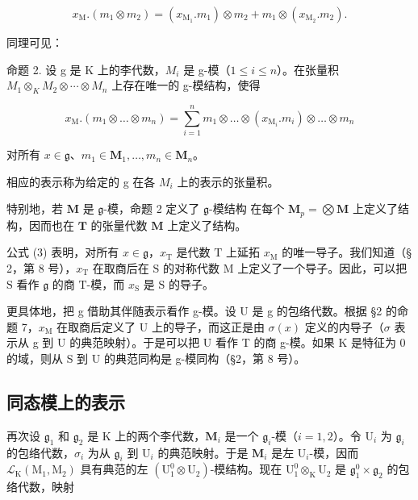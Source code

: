 \[
x _ {\mathrm{M}}. (m _ {1} \otimes m _ {2}) = (x _ {\mathrm{M} _ {1}}. m _ {1}) \otimes m _ {2} + m _ {1} \otimes (x _ {\mathrm{M} _ {2}}. m _ {2}).\tag{2}
\]

同理可见：

命题 2. 设 g 是 K 上的李代数，\(M_{i}\) 是 g-模（\(1 \leqslant i \leqslant n\)）。在张量积 \(M_{1} \otimes_{K} M_{2} \otimes \cdots \otimes M_{n}\) 上存在唯一的 g-模结构，使得

\[
x _ {\mathrm{M}}. (m _ {1} \otimes \dots \otimes m _ {n}) = \sum_ {i = 1} ^ {n} m _ {1} \otimes \dots \otimes (x _ {\mathrm{M} _ {i}}. m _ {i}) \otimes \dots \otimes m _ {n}\tag{3}
\]

对所有 \(x \in \mathfrak{g}\)、\(m_1 \in \mathbf{M}_1, \ldots, m_n \in \mathbf{M}_n\)。

相应的表示称为给定的 g 在各 \(M_{i}\) 上的表示的张量积。

特别地，若 \(\mathbf{M}\) 是 \(\mathfrak{g}\)-模，命题 2 定义了 \(\mathfrak{g}\)-模结构
在每个 \(\mathbf{M}_p = \bigotimes \mathbf{M}\) 上定义了结构，因而也在 \(\mathbf{T}\) 的张量代数 \(\mathbf{M}\) 上定义了结构。

公式 (3) 表明，对所有 \(x \in \mathfrak{g}\)，\(x_{\mathrm{T}}\) 是代数 \(\mathrm{T}\) 上延拓 \(x_{\mathrm{M}}\) 的唯一导子。我们知道（§ 2，第 8 号），\(x_{\mathrm{T}}\) 在取商后在 \(\mathrm{S}\) 的对称代数 \(\mathrm{M}\) 上定义了一个导子。因此，可以把 \(\mathrm{S}\) 看作 \(\mathfrak{g}\) 的商 \(\mathrm{T}\)-模，而 \(x_{\mathrm{S}}\) 是 \(\mathrm{S}\) 的导子。

更具体地，把 g 借助其伴随表示看作 g-模。设 U 是 g 的包络代数。根据 §2 的命题 7，\(x_{\mathrm{M}}\) 在取商后定义了 U 上的导子，而这正是由 \(\sigma(x)\) 定义的内导子（\(\sigma\) 表示从 g 到 U 的典范映射）。于是可以把 U 看作 T 的商 g-模。如果 K 是特征为 0 的域，则从 S 到 U 的典范同构是 g-模同构（§2，第 8 号）。

\subsection{同态模上的表示}

再次设 \(\mathfrak{g}_1\) 和 \(\mathfrak{g}_2\) 是 K 上的两个李代数，\(\mathbf{M}_i\) 是一个 \(\mathfrak{g}_i\)-模（\(i = 1, 2\)）。令 \(\mathrm{U}_i\) 为 \(\mathfrak{g}_i\) 的包络代数，\(\sigma_i\) 为从 \(\mathfrak{g}_i\) 到 \(\mathrm{U}_i\) 的典范映射。于是 \(\mathbf{M}_i\) 是左 \(\mathrm{U}_i\)-模，因而 \(\mathcal{L}_{\mathrm{K}}(\mathrm{M}_1, \mathrm{M}_2)\) 具有典范的左 \((\mathrm{U}_1^0 \otimes \mathrm{U}_2)\)-模结构。现在 \(\mathrm{U}_1^0 \otimes_{\mathrm{K}} \mathrm{U}_2\) 是 \(\mathfrak{g}_1^0 \times \mathfrak{g}_2\) 的包络代数，映射

